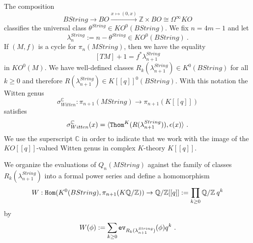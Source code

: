 \documentclass[12pt]{article}
\newcommand{\Thom}{{\tt Thom}}
\newcommand{\ev}{{\tt ev}}
\newcommand{\Z}{{\mathbb{Z}}}
\newcommand{\Q}{{\mathbb{Q}}}
\newcommand{\C}{{\mathbb{C}}}
\newcommand{\Hom}{{\tt Hom}}
\begin{document}
The composition
$$BString\to BO\stackrel{x\mapsto (0,x)}{\longrightarrow} \Z\times BO\cong \Omega^{\infty} KO$$
classifies the universal class $\theta^{String}\in KO^{0}(BString)$.
We fix $n=4m-1$ and let 
\begin{equation}\label{eq1100}\lambda^{String}_{n}:=n-\theta^{String}\in KO^{0}(BString)\ .\end{equation}
If $(M,f)$ is a cycle for $\pi_{n}(MString)$, then we have the equality
\begin{equation}\label{eq2001v}[TM]+1 = f^{*}\lambda^{String}_{n+1}\end{equation}
in $KO^{0}(M)$.
We  have well-defined classes $R_{k}(\lambda^{String}_{n+1})\in K^0(BString)$ for all $k\ge 0$
and therefore $R(\lambda_{n+1}^{String})\in K[[q]]^{0}(BString)$. With this notation the Witten genus
$$\sigma_{Witten}^{\C}:\pi_{n+1}(MString)\to \pi_{n+1}(K[[q]])$$ satisfies 
\begin{equation}\label{eqwitten}\sigma_{Witten}^{\C}(x)=\langle \Thom^{K}(R(\lambda_{n+1}^{String})),\epsilon(x)\rangle \ .\end{equation}
We use the superscript $\C$ in order to indicate that we work with the image of the $KO[[q]]$-valued Witten genus in complex $K$-theory $K[[q]]$. 

We organize the evaluations of  $Q_{n}(MString)$ against the family of classes $R_{k}(\lambda^{String}_{n+1})$ into a formal power series and
define a homomorphism
\begin{equation}\label{eq1100v}W:\Hom(K^{0}(BString),\pi_{n+1}(K\Q/\Z))\to \Q/\Z[[q]]:=\prod_{k\ge 0} \Q/\Z\: q^{k}\end{equation}
by
$$W(\phi):=\sum_{k\ge 0} \ev_{R_{k}(\lambda^{String}_{n+1})}(\phi)q^{k}\ .$$
 
\end{document}
